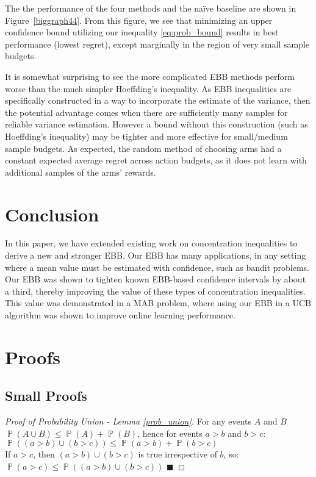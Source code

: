 \documentclass[runningheads, envcountsame, a4paper]{llncs}
\DeclareMathOperator{\p}{\mathbb{P}}
\begin{document}
The the performance of the four methods and the na\"{i}ve baseline are shown in Figure~\ref{biggraph44}.
From this figure, we see that minimizing an upper confidence bound utilizing our inequality \eqref{eq:prob_bound} results in best performance (lowest regret), except marginally in the region of very small sample budgets. 

It is somewhat surprising to see the more complicated EBB methods \cite{Maurer50empiricalbernstein,10.1007/978-3-540-75225-7_15} perform worse than the much simpler Hoeffding's inequality. As EBB inequalities are specifically constructed in a way to incorporate the estimate of the variance, then the potential advantage comes when there are sufficiently many samples for reliable variance estimation. However a bound without this construction (such as Hoeffding's inequality) may be tighter and more effective for small/medium sample budgets. 
As expected, the random method of choosing arms had a constant expected average regret across action budgets, as it does not learn with additional samples of the arms' rewards.


\section{Conclusion}\label{sec:conclusion}

In this paper, we have extended existing work on concentration inequalities to derive a new and stronger EBB.
Our EBB has many applications, in any setting where a mean value must be estimated with confidence, such as bandit problems.
Our EBB was shown to tighten known EBB-based confidence intervals by about a third, thereby improving the value of these types of concentration inequalities. 
This value was demonstrated in a MAB problem, where using our EBB in a UCB algorithm was shown to improve online learning performance.


\appendix
\section{Proofs}
\subsection{Small Proofs}\label{appendix:small}
\begin{proof}[Proof of Probability Union - Lemma \ref{prob_union}]
For any events $A$ and $B$\\
$\p(A\cup B) \le \p(A)+\p(B)$, hence for events $a>b$ and $b>c$:\\ $\p((a>b) \cup (b>c)) \le \p(a>b) + \p(b>c)$\\
If $a>c$, then $(a>b) \cup (b>c)$ is true irrespective of $b$, so:\\
$\p(a>c) \le \p((a>b) \cup (b>c))$
\hfill $\blacksquare$
\end{proof}
\end{document}
